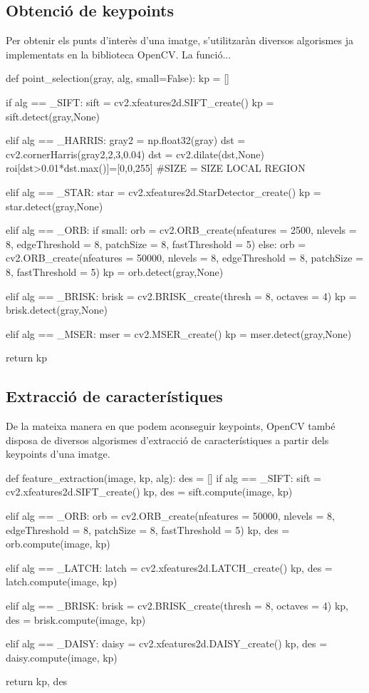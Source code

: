 	\subsection{Obtenció de keypoints}
		Per obtenir els punts d'interès d'una imatge, s'utilitzaràn diversos algorismes ja implementats en la biblioteca OpenCV. La funció... \\
		\begin{python}
def point_selection(gray, alg, small=False):
	kp = []

	if alg == _SIFT:
		sift = cv2.xfeatures2d.SIFT_create()
		kp = sift.detect(gray,None)

	elif alg == _HARRIS:
		gray2 = np.float32(gray)
		dst = cv2.cornerHarris(gray2,2,3,0.04)
		dst = cv2.dilate(dst,None)
		roi[dst>0.01*dst.max()]=[0,0,255]
		#SIZE = SIZE LOCAL REGION

	elif alg == _STAR:
		star = cv2.xfeatures2d.StarDetector_create()
		kp = star.detect(gray,None)

	elif alg == _ORB:
		if small:
			orb = cv2.ORB_create(nfeatures = 2500, nlevels = 8, edgeThreshold = 8, patchSize = 8, fastThreshold = 5)
		else:
			orb = cv2.ORB_create(nfeatures = 50000, nlevels = 8, edgeThreshold = 8, patchSize = 8, fastThreshold = 5)
		kp = orb.detect(gray,None)

	elif alg == _BRISK:
		brisk = cv2.BRISK_create(thresh = 8, octaves = 4)
		kp = brisk.detect(gray,None)

	elif alg == _MSER:
		mser = cv2.MSER_create()
		kp = mser.detect(gray,None)

	return kp
		\end{python}
	\subsection{Extracció de característiques}
		De la mateixa manera en que podem aconseguir keypoints, OpenCV també disposa de diversos algorismes d'extracció de característiques a partir dels keypoints d'una imatge.\\
		\begin{python}
def feature_extraction(image, kp, alg):
	des = []
	if alg == _SIFT:
		sift = cv2.xfeatures2d.SIFT_create()
		kp, des = sift.compute(image, kp)

	elif alg == _ORB:
		orb = cv2.ORB_create(nfeatures = 50000, nlevels = 8, edgeThreshold = 8, patchSize = 8, fastThreshold = 5)
		kp, des = orb.compute(image, kp)

	elif alg == _LATCH:
		latch = cv2.xfeatures2d.LATCH_create()
		kp, des = latch.compute(image, kp)

	elif alg == _BRISK:
		brisk = cv2.BRISK_create(thresh = 8, octaves = 4)
		kp, des = brisk.compute(image, kp)

	elif alg == _DAISY:
		daisy = cv2.xfeatures2d.DAISY_create()
		kp, des = daisy.compute(image, kp)

	return kp, des
		\end{python}
\newpage
